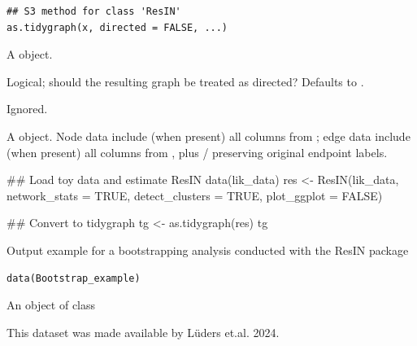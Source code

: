 \documentclass[a4paper]{book}
\begin{document}
%
\begin{Usage}
\begin{verbatim}
## S3 method for class 'ResIN'
as.tidygraph(x, directed = FALSE, ...)
\end{verbatim}
\end{Usage}
%
\begin{Arguments}
\begin{ldescription}
\item[\code{x}] A  object.

\item[\code{directed}] Logical; should the resulting graph be treated as directed?
Defaults to .

\item[\code{...}] Ignored.
\end{ldescription}
\end{Arguments}
%
\begin{Value}
A  object. Node data include (when present)
all columns from ; edge data include (when present)
all columns from , plus /
preserving original endpoint labels.
\end{Value}
%
\begin{Examples}
\begin{ExampleCode}
## Load toy data and estimate ResIN
data(lik_data)
res <- ResIN(lik_data, network_stats = TRUE, detect_clusters = TRUE,
             plot_ggplot = FALSE)

## Convert to tidygraph
tg <- as.tidygraph(res)
tg

\end{ExampleCode}
\end{Examples}
%
\begin{Description}
Output example for a bootstrapping analysis conducted with the ResIN package
\end{Description}
%
\begin{Usage}
\begin{verbatim}
data(Bootstrap_example)
\end{verbatim}
\end{Usage}
%
\begin{Format}
An object of class 
\end{Format}
%
\begin{References}
This dataset was made available by Lüders et.al. 2024.
\end{References}
\end{document}
